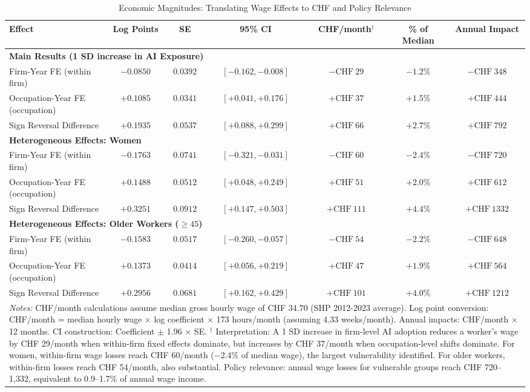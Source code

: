 \begin{table}[htbp]
\centering
\caption{Economic Magnitudes: Translating Wage Effects to CHF and Policy Relevance}
\label{tab:economic_magnitudes}
\small
\begin{tabular}{lcccccc}
\toprule
\textbf{Effect} & \textbf{Log Points} & \textbf{SE} & \textbf{95\% CI} & \textbf{CHF/month}$^{\dagger}$ & \textbf{\% of Median} & \textbf{Annual Impact} \\
\midrule
\multicolumn{7}{l}{\textbf{Main Results (1 SD increase in AI Exposure)}} \\
Firm-Year FE (within firm) & $-0.0850$ & $0.0392$ & $[-0.162, -0.008]$ & $-\text{CHF}~29$ & $-1.2\%$ & $-\text{CHF}~348$ \\
Occupation-Year FE (occupation) & $+0.1085$ & $0.0341$ & $[+0.041, +0.176]$ & $+\text{CHF}~37$ & $+1.5\%$ & $+\text{CHF}~444$ \\
Sign Reversal Difference & $+0.1935$ & $0.0537$ & $[+0.088, +0.299]$ & $+\text{CHF}~66$ & $+2.7\%$ & $+\text{CHF}~792$ \\
\midrule
\multicolumn{7}{l}{\textbf{Heterogeneous Effects: Women}} \\
Firm-Year FE (within firm) & $-0.1763$ & $0.0741$ & $[-0.321, -0.031]$ & $-\text{CHF}~60$ & $-2.4\%$ & $-\text{CHF}~720$ \\
Occupation-Year FE (occupation) & $+0.1488$ & $0.0512$ & $[+0.048, +0.249]$ & $+\text{CHF}~51$ & $+2.0\%$ & $+\text{CHF}~612$ \\
Sign Reversal Difference & $+0.3251$ & $0.0912$ & $[+0.147, +0.503]$ & $+\text{CHF}~111$ & $+4.4\%$ & $+\text{CHF}~1332$ \\
\midrule
\multicolumn{7}{l}{\textbf{Heterogeneous Effects: Older Workers ($\geq 45$)}} \\
Firm-Year FE (within firm) & $-0.1583$ & $0.0517$ & $[-0.260, -0.057]$ & $-\text{CHF}~54$ & $-2.2\%$ & $-\text{CHF}~648$ \\
Occupation-Year FE (occupation) & $+0.1373$ & $0.0414$ & $[+0.056, +0.219]$ & $+\text{CHF}~47$ & $+1.9\%$ & $+\text{CHF}~564$ \\
Sign Reversal Difference & $+0.2956$ & $0.0681$ & $[+0.162, +0.429]$ & $+\text{CHF}~101$ & $+4.0\%$ & $+\text{CHF}~1212$ \\
\bottomrule
\multicolumn{7}{p{\textwidth}}{\footnotesize
\textit{Notes:}
CHF/month calculations assume median gross hourly wage of CHF 34.70 (SHP 2012-2023 average).
Log point conversion: CHF/month = median hourly wage $\times$ log coefficient $\times$ 173 hours/month (assuming 4.33 weeks/month).
Annual impacts: CHF/month $\times$ 12 months.
CI construction: Coefficient $\pm$ 1.96 $\times$ SE.
$^{\dagger}$ Interpretation: A 1 SD increase in firm-level AI adoption reduces a worker's wage by CHF 29/month when within-firm fixed effects dominate,
but increases by CHF 37/month when occupation-level shifts dominate.
For women, within-firm wage losses reach CHF 60/month ($-$2.4\% of median wage), the largest vulnerability identified.
For older workers, within-firm losses reach CHF 54/month, also substantial. Policy relevance: annual wage losses for vulnerable groups reach CHF 720--1,332,
equivalent to 0.9--1.7\% of annual wage income.
}
\end{tabular}
\end{table}
